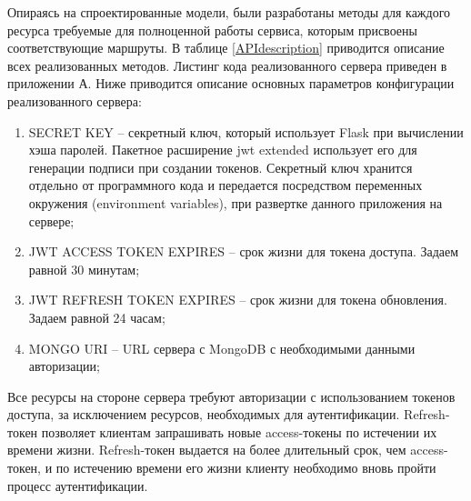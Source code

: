 Опираясь на спроектированные модели, были разработаны методы для каждого ресурса требуемые для полноценной работы сервиса, которым присвоены соответствующие маршруты. В таблице \ref{APIdescription} приводится описание всех реализованных методов. Листинг кода реализованного сервера приведен в приложении А. Ниже приводится описание основных параметров конфигурации реализованного сервера:
\begin{enumerate}
	\item SECRET KEY -- секретный ключ, который использует Flask при
	вычислении хэша паролей. Пакетное расширение jwt extended использует его для генерации подписи при создании токенов. Секретный ключ хранится отдельно от программного кода и передается посредством переменных окружения (environment variables), при развертке данного приложения на сервере;
	\item JWT ACCESS TOKEN EXPIRES -- срок жизни для токена доступа.  Задаем равной 30 минутам;
	\item JWT REFRESH TOKEN EXPIRES -- срок жизни для токена обновления. Задаем равной 24 часам;
	\item MONGO URI -- URL сервера с MongoDB с необходимыми
	данными авторизации;
\end{enumerate}

Все ресурсы на стороне сервера требуют авторизации с использованием токенов доступа, за исключением ресурсов, необходимых для аутентификации. Refresh-токен позволяет клиентам запрашивать новые access-токены по истечении их времени жизни. Refresh-токен выдается на более длительный срок, чем access-токен, и по истечению времени его жизни клиенту необходимо вновь пройти процесс аутентификации.


